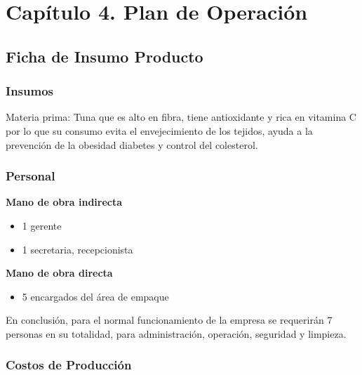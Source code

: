 \documentclass[
  stu,
  floatsintext,
  longtable,
  a4paper,
  nolmodern,
  notxfonts,
  notimes,
  12pt,
  colorlinks=true,linkcolor=blue,citecolor=blue,urlcolor=blue]{apa7}
\providecommand{\tightlist}{%
  \setlength{\itemsep}{0pt}\setlength{\parskip}{0pt}}
\begin{document}
\section{Capítulo 4. Plan de
Operación}\label{capuxedtulo-4.-plan-de-operaciuxf3n}

\subsection{Ficha de Insumo Producto}\label{ficha-de-insumo-producto}

\subsubsection{Insumos}\label{insumos}

Materia prima: Tuna que es alto en fibra, tiene antioxidante y rica en
vitamina C por lo que su consumo evita el envejecimiento de los tejidos,
ayuda a la prevención de la obesidad diabetes y control del colesterol.

\subsubsection{Personal}\label{personal}

\textbf{Mano de obra indirecta}

\begin{itemize}
\tightlist
\item
  1 gerente
\item
  1 secretaria, recepcionista
\end{itemize}

\textbf{Mano de obra directa}

\begin{itemize}
\tightlist
\item
  5 encargados del área de empaque
\end{itemize}

En conclusión, para el normal funcionamiento de la empresa se requerirán
7 personas en su totalidad, para administración, operación, seguridad y
limpieza.

\subsubsection{Costos de Producción}\label{costos-de-producciuxf3n}
\end{document}
